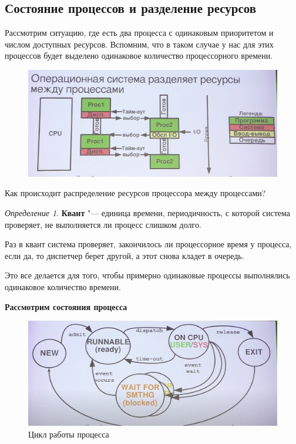 \documentclass[bachelor, och, book]{SCWorks}
\theoremstyle{remark}
\newtheorem{definition}{Определение}
\begin{document}
    \subsection{Состояние процессов и разделение ресурсов}

    Рассмотрим ситуацию, где есть два процесса с одинаковым приоритетом и числом доступных ресурсов. Вспомним, что в таком случае у нас для этих процессов будет выделено одинаковое количество процессорного времени.

    \begin{figure}[H]
        \begin{center}
            \includegraphics[scale=0.3]{res/example-two-process.png}
            \caption{}
        \end{center}
    \end{figure}

    Как происходит распределение ресурсов процессора между процессами? 
    
    \begin{definition}
        \textbf{Квант} "--- единица времени, периодичность, с которой система проверяет, не выполняется ли процесс слишком долго.
    \end{definition}

    Раз в квант система проверяет, закончилось ли процессорное время у процесса, если да, то диспетчер берет другой, а этот снова кладет в очередь.
     
    Это все делается для того, чтобы примерно одинаковые процессы выполнялись одинаковое количество времени.

    \textbf{Рассмотрим состояния процесса}

    \begin{figure}[H]
        \begin{center}
            \includegraphics[scale=0.3]{res/model-of-process-with-5-states.png}
            \caption{Цикл работы процесса}
        \end{center}
    \end{figure}
\end{document}
